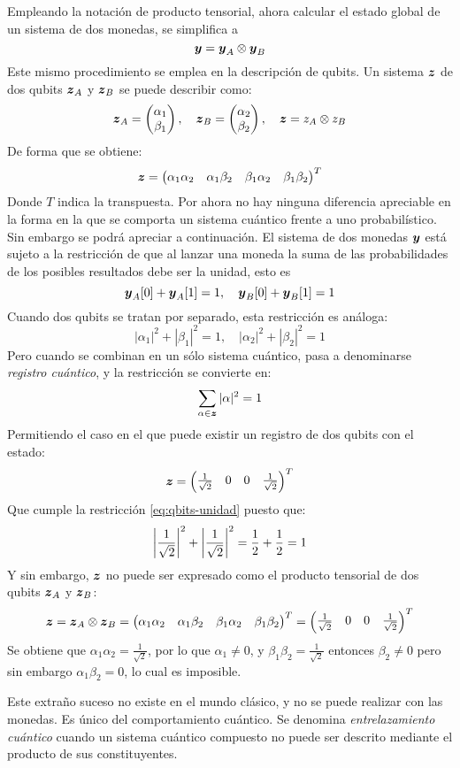 Empleando la notación de producto tensorial, ahora calcular el estado global de 
un sistema de dos monedas, se simplifica a
%
$$ \boldsymbol{y} = \boldsymbol{y}_A \otimes \boldsymbol{y}_B $$
%
Este mismo procedimiento se emplea en la descripción de qubits. Un sistema $\boldsymbol{z}$ de dos qubits $\boldsymbol{z}_A$ y $\boldsymbol{z}_B$ se puede describir como:
%
$$
\boldsymbol{z}_A = \begin{pmatrix} \alpha_1 \\ \beta_1 \end{pmatrix}, \quad
\boldsymbol{z}_B = \begin{pmatrix} \alpha_2 \\ \beta_2 \end{pmatrix}, \quad
\boldsymbol{z} = z_A \otimes z_B $$
%
De forma que se obtiene:
%
$$
\boldsymbol{z} = \begin{pmatrix} \alpha_1 \alpha_2 & \alpha_1 \beta_2
	& \beta_1 \alpha_2 & \beta_1 \beta_2 \end{pmatrix}^T $$
%
Donde $T$ indica la transpuesta. Por ahora no hay ninguna diferencia apreciable 
en la forma en la que se comporta un sistema cuántico frente a uno 
probabilístico.  Sin embargo se podrá apreciar a continuación. El sistema de dos 
monedas $\boldsymbol{y}$ está sujeto a la restricción de que al lanzar una moneda la suma 
de las probabilidades de los posibles resultados debe ser la unidad, esto es
%
$$ \boldsymbol{y}_A[0] + \boldsymbol{y}_A[1] = 1, \quad \boldsymbol{y}_B[0] + \boldsymbol{y}_B[1] = 1$$
%
Cuando dos qubits se tratan por separado, esta restricción es análoga:
%
$$|\alpha_1|^2 + |\beta_1|^2 = 1, \quad |\alpha_2|^2 + |\beta_2|^2 = 1$$
%
Pero cuando se combinan en un sólo sistema cuántico, pasa a denominarse 
\textit{registro cuántico}, y la restricción se convierte en:
\begin{equation}
\label{eq:qbits-unidad}
\sum_{\alpha \in \boldsymbol{z}} |\alpha|^2 = 1
\end{equation}
%
Permitiendo el caso en el que puede existir un registro de dos qubits con el 
estado:
$$ \boldsymbol{z} = \begin{pmatrix} \frac{1}{\sqrt{2}} & 0 & 0 & \frac{1}{\sqrt{2}} \end{pmatrix}^T $$
Que cumple la restricción \eqref{eq:qbits-unidad} puesto que:
$$ \left|\frac{1}{\sqrt{2}}\right|^2 + \left|\frac{1}{\sqrt{2}}\right|^2 = \frac{1}{2} + 
\frac{1}{2} = 
1 $$
Y sin embargo, $\boldsymbol{z}$ no puede ser expresado como el producto tensorial de dos 
qubits $\boldsymbol{z}_A$ y $\boldsymbol{z}_B$:
$$ \boldsymbol{z} = \boldsymbol{z}_A \otimes \boldsymbol{z}_B = \begin{pmatrix} \alpha_1 \alpha_2 & \alpha_1 \beta_2
	& \beta_1 \alpha_2 & \beta_1 \beta_2 \end{pmatrix}^T = \begin{pmatrix} \frac{1}{\sqrt{2}} & 0 & 0 & 
\frac{1}{\sqrt{2}} \end{pmatrix}^T
$$
Se obtiene que $\alpha_1 \alpha_2 = \frac{1}{\sqrt{2}}$, por lo que $\alpha_1 
\neq 0$, y $\beta_1 \beta_2 = \frac{1}{\sqrt{2}}$ entonces $\beta_2 \neq 0$ 
pero sin embargo $\alpha_1 \beta_2 = 0$, lo cual es imposible.

Este extraño suceso no existe en el mundo clásico, y no se puede realizar con 
las monedas. Es único del comportamiento cuántico. Se denomina 
\textit{entrelazamiento cuántico} cuando un sistema cuántico compuesto no puede 
ser descrito mediante el producto de sus constituyentes.

